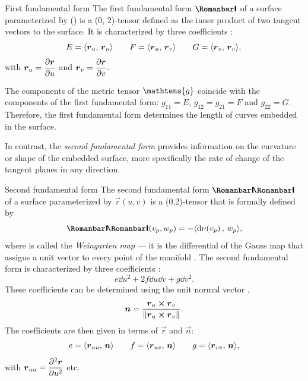     \begin{thmblock}{First fundamental form} 
        The first fundamental form $\firstff$ of a surface parameterized by () is a (0, 2)-tensor defined as the inner product of two tangent vectors to the surface. It is characterized by three coefficients :
        \begin{equation}
                E = \langle \vb*{r}_u,\, \vb*{r}_u\rangle \qquad F = \langle \vb*{r}_u,\, \vb*{r}_v\rangle \qquad G = \langle \vb*{r}_v,\, \vb*{r}_v\rangle,\\
            \label{eq:first_fform}
        \end{equation}
        with $\displaystyle\vb*{r}_u = \pdv{\vb*{r}}{u}$ and $\displaystyle\vb*{r}_v = \pdv{\vb*{r}}{v}$.
    \end{thmblock}
The components of the metric tensor \(\mathtens{g}\) coincide with the components of the first fundamental form: \(g_{11} = E\), \(g_{12} = g_{21}= F\) and \(g_{22} = G\). Therefore, the first fundamental form determines the length of curves embedded in the surface.

In contrast, the \emph{second fundamental form}  provides information on the curvature or shape of the embedded surface, more specifically the rate of change of the tangent planes in any direction. 
\begin{thmblock}{Second fundamental form}
    The second fundamental form $\secondff$ of a surface parameterized by $\vec{r}(u,v)$ is a (0,2)-tensor that is formally defined by
    $$ \secondff(v_p, w_p) = -\inner{\dd{\nu(v_p)}}{w_p}, $$
    where  is called the \emph{Weingarten map} --- it is the differential of the Gauss map  that assigns a unit vector to every point of the manifold \cite{Spivak1999b}. The second fundamental form is characterized by three coefficients :
    \[ e\dd{u}^2 + 2f\dd{u}\dd{v} + g\dd{v}^2. \]
    These coefficients can be determined using the unit normal vector ,
    \begin{equation}
        \vb*{n} =  \frac{\vb*{r}_u \cross \vb*{r}_v}{\norm{\vb*{r}_u \cross \vb*{r}_v}}.
        \label{eq:unit_normal}
    \end{equation}
    The coefficients are then given in terms of $\vec{r}$ and $\vec{n}$:
    \begin{equation}
            e = \langle \vb*{r}_{uu},\, \vb*{n}\rangle
            \qquad f = \langle \vb*{r}_{uv},\, \vb*{n}\rangle \qquad g = \langle \vb*{r}_{vv},\, \vb*{n}\rangle,
        \label{eq:second_fform}
    \end{equation}
    with $\displaystyle \vb*{r}_{uu} = \pdv[2]{\vb*{r}}{u}$ etc.
\end{thmblock}

